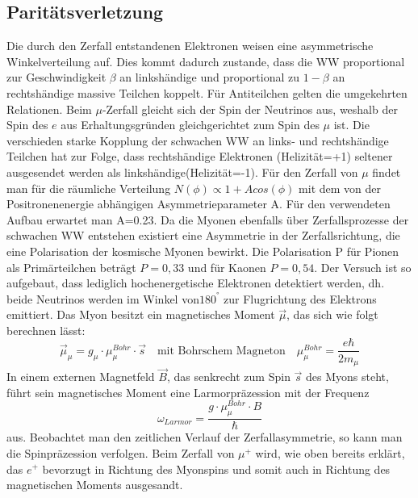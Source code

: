 \subsection{Paritätsverletzung}
Die durch den Zerfall entstandenen Elektronen weisen eine asymmetrische Winkelverteilung auf. Dies kommt dadurch zustande, dass die WW proportional zur Geschwindigkeit $\beta$ an linkshändige und proportional zu $1-\beta$ an rechtshändige massive Teilchen koppelt. Für Antiteilchen gelten die umgekehrten Relationen. Beim $\mu$-Zerfall gleicht sich der Spin der Neutrinos aus, weshalb der Spin des $e$ aus Erhaltungsgründen gleichgerichtet zum Spin des $\mu$ ist. Die verschieden starke Kopplung der schwachen WW an links- und rechtshändige Teilchen hat zur Folge, dass rechtshändige Elektronen (Helizität=+1) seltener ausgesendet werden als linkshändige(Helizität=-1). Für den Zerfall von $\mu$ findet man für die räumliche Verteilung $N(\phi) \propto 1+A cos(\phi) $ mit dem von der Positronenenergie abhängigen Asymmetrieparameter A. Für den verwendeten Aufbau erwartet man A=0.23. Da die Myonen ebenfalls über Zerfallsprozesse der schwachen WW entstehen existiert eine Asymmetrie in der Zerfallsrichtung, die eine Polarisation der kosmische Myonen bewirkt. Die Polarisation P für Pionen als Primärteilchen beträgt $P = 0,33$ und für Kaonen $P = 0,54$. Der Versuch ist so aufgebaut, dass lediglich hochenergetische Elektronen detektiert werden, dh. beide Neutrinos werden im Winkel von$180^{°}$ zur Flugrichtung des Elektrons emittiert. Das Myon besitzt ein magnetisches Moment $\vec{\mu}$, das sich wie folgt berechnen lässt:
\begin{equation}
	\vec{\mu} _{\mu} = g_{\mu} \cdot \mu ^{Bohr} _{\mu} \cdot \vec{s}
	\quad
	\text{mit Bohrschem Magneton}
	\quad 
	\mu ^{Bohr} _{\mu} = \frac{e \hbar}{2 m_{\mu}}
\end{equation}In einem externen Magnetfeld $\vec{B}$, das senkrecht zum Spin $\vec{s}$ des Myons steht, führt sein magnetisches Moment eine Larmorpräzession mit der Frequenz
\begin{equation}
	\omega_{Larmor}
	=
	\frac{g\cdot \mu ^{Bohr} _{\mu}\cdot B}{\hbar}
\end{equation}
aus. Beobachtet man den zeitlichen Verlauf der Zerfallasymmetrie, so kann man die Spinpräzession verfolgen. Beim Zerfall von $\mu ^{+}$ wird, wie oben bereits erklärt, das $e^{+}$ bevorzugt in Richtung des Myonspins und somit auch in Richtung des magnetischen Moments ausgesandt.